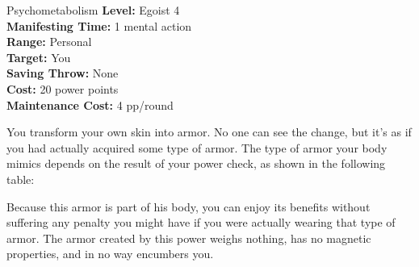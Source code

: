 {Psychometabolism}
{
	\textbf{Level:}
	Egoist 4\\
	\textbf{Manifesting Time:}
	1 mental action\\
	\textbf{Range:}
	Personal\\
	\textbf{Target:}
	You\\
	\textbf{Saving Throw:}
	None\\
	\textbf{Cost:}
	20 power points\\
	\textbf{Maintenance Cost:}
	4 pp/round\\
}
{
	You transform your own skin into armor. No one can see the change, but it's as if you had actually acquired some type of armor. The type of armor your body mimics depends on the result of your power check, as shown in the following table:


	Because this armor is part of his body, you can enjoy its benefits without suffering any penalty you might have if you were actually wearing that type of armor. The armor created by this power weighs nothing, has no magnetic properties, and in no way encumbers you.
}